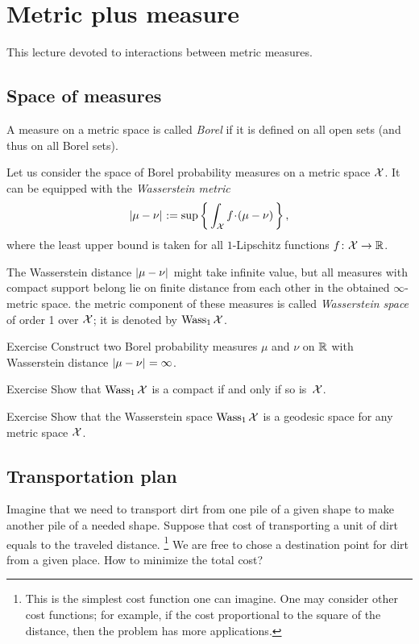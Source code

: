 \chapter{Metric plus measure}

This lecture devoted to interactions between metric measures.

\section{Space of measures}

A measure on a metric space is called \emph{Borel} if it is defined on all open sets (and thus on all Borel sets).

Let us consider the space of Borel probability measures on a metric space $\mathcal{X}$.
It can be equipped with the \emph{Wasserstein metric}
\[\dist{\mu}{\nu}{}\df\sup\left\{\,\int_{\spc{X}} f\cdot(\mu-\nu)\,\right\},\]
where the least upper bound is taken for all $1$-Lipschitz functions $f\colon\mathcal{X}\to\mathbb{R}$.

The Wasserstein distance $\dist{\mu}{\nu}{}$ might take infinite value, but all measures with compact support belong lie on finite distance from each other in the obtained $\infty$-metric space.
the metric component of these measures is called \emph{Wasserstein space} of order 1 over $\mathcal{X}$; 
it is denoted by $\operatorname{\rm Wass}\nolimits_1\mathcal{X}$.

\begin{thm}{Exercise}\label{ex:wasserstein-infty}
Construct two Borel probability measures $\mu$ and $\nu$ on $\mathbb{R}$ with Wasserstein distance $\dist{\mu}{\nu}{}=\infty$.
\end{thm}


\begin{thm}{Exercise}\label{ex:wasserstein-compact}
Show that $\operatorname{\rm Wass}\nolimits_1\mathcal{X}$ is a compact if and only if so is~$\mathcal{X}$.
\end{thm}

\begin{thm}{Exercise}\label{ex:wasserstein-length}
Show that the Wasserstein space $\operatorname{\rm Wass}\nolimits_1\mathcal{X}$ is a geodesic space for any metric space $\mathcal{X}$.
\end{thm}

\section{Transportation plan}

Imagine that we need to transport dirt from one pile of a given shape to make another pile of a needed shape.
Suppose that cost of transporting a unit of dirt equals to the traveled distance.%
\footnote{This is the simplest cost function one can imagine.
One may consider other cost functions; for example, if the cost proportional to the square of the distance, then the problem has more applications.}
We are free to chose a destination point for dirt from a given place.
How to minimize the total cost?

